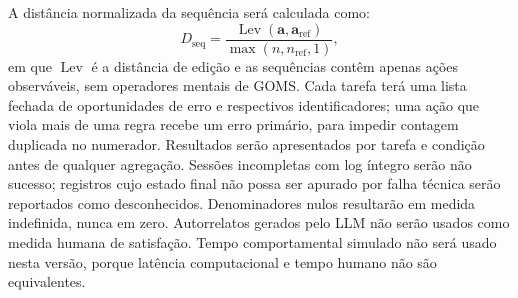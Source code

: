 \documentclass[conference]{IEEEtran}
\begin{document}
A distância normalizada da sequência será calculada como:
\begin{equation}
D_{\mathrm{seq}}=\frac{\operatorname{Lev}(\mathbf{a},\mathbf{a}_{\mathrm{ref}})}{\max(n,n_{\mathrm{ref}},1)},
\end{equation}
em que $\operatorname{Lev}$ é a distância de edição e as sequências contêm apenas ações observáveis, sem operadores mentais de GOMS. Cada tarefa terá uma lista fechada de oportunidades de erro e respectivos identificadores; uma ação que viola mais de uma regra recebe um erro primário, para impedir contagem duplicada no numerador. Resultados serão apresentados por tarefa e condição antes de qualquer agregação. Sessões incompletas com log íntegro serão não sucesso; registros cujo estado final não possa ser apurado por falha técnica serão reportados como desconhecidos. Denominadores nulos resultarão em medida indefinida, nunca em zero. Autorrelatos gerados pelo LLM não serão usados como medida humana de satisfação. Tempo comportamental simulado não será usado nesta versão, porque latência computacional e tempo humano não são equivalentes.
\end{document}
